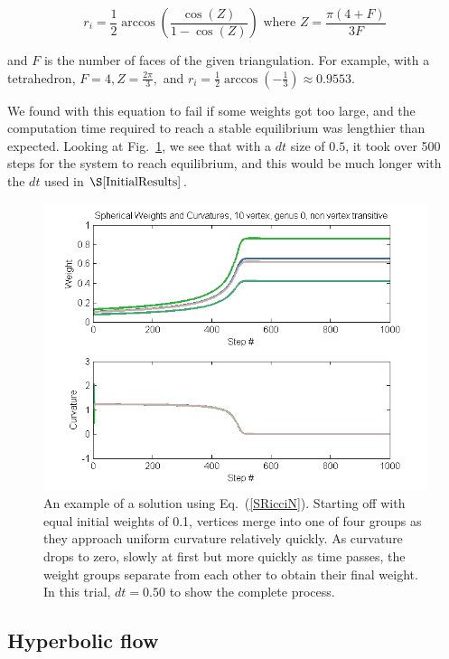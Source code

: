 \documentclass[12pt]{article}
\begin{document}
$$r_i = \frac{1}{2}\arccos(\frac{\cos(Z)}{1 - \cos(Z)}) \mbox{ where } Z = \frac{\pi(4 + F)}{3F}$$

\noindent and $F$ is the number of faces of the given triangulation. For example, with a tetrahedron, $F = 4, Z = \frac{2\pi}{3},$ and $r_i = \frac{1}{2}\arccos(-\frac{1}{3}) \approx 0.9553.$ \newline

\noindent We found with this equation to fail if some weights got too large, and the computation time required to reach a stable equilibrium was lengthier than expected. Looking at Fig.~\ref{SphGood}, we see that with a $dt$ size of $0.5$, it took over 500 steps for the system to reach equilibrium, and this would be much longer with the $dt$ used in $\S\ref{InitialResults}$.  

\begin{figure}[ht]
\centering
\includegraphics[scale = 0.8]{Pictures/SphG0V10.png}
\caption{An example of a solution using Eq.~(\ref{SRicciN}). Starting off with equal initial weights of 0.1, vertices merge into one of four groups as they approach uniform curvature relatively quickly. As curvature drops to zero, slowly at first but more quickly as time passes, the weight groups separate from each other to obtain their final weight. In this trial, $dt = 0.50$ to show the complete process.}
\label{SphGood}  
\end{figure}

\subsection{Hyperbolic flow}
\end{document}
